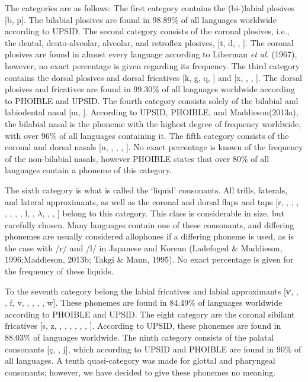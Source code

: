 The categories are as follows: The first category contains the (bi-)labial plosives [b, p]. The bilabial plosives are found in 98.89\% of all languages worldwide according to UPSID. The second category consists of the coronal plosives, i.e., the dental, dento-alveolar, alveolar, and retroflex plosives, [t, d, \textrtailt, \textrtaild]. The coronal plosives are found in almost every language according to Liberman \textit{et al.} (1967), however, no exact percentage is given regarding its frequency. The third category contains the dorsal plosives and dorsal fricatives [k, g, q, \textscg] and [x, \textgamma, \textchi, \textinvscr]. The dorsal plosives and fricatives are found in 99.30\% of all languages worldwide according to PHOIBLE and UPSID. The fourth category consists solely of the bilabial and labiodental nasal [m, \textltailm]. According to UPSID, PHOIBLE, and Maddieson(2013a), the bilabial nasal is the phoneme with the highest degree of frequency worldwide, with over 96\% of all languages containing it. The fifth category consists of the coronal and dorsal nasals [n, \textrtailn ,  \textltailn, \ng, \textscn]. No exact percentage is known of the frequency of the non-bilabial nasals, however PHOIBLE states that over 80\% of all languages contain a phoneme of this category. 

The sixth category is what is called the ‘liquid’ consonants. All trills, laterals, and lateral approximants, as well as the coronal and dorsal flaps and taps [r, \textscr , \textfishhookr, \textrtailr, \textbeltl, \textlyoghlig, \textturnr, \textturnrrtail, l, \textrtaill, $\lambda$, \textscl, \textturnmrleg,  \textturnlonglegr] belong to this category. This class is considerable in size, but carefully chosen. Many languages contain one of these consonants, and differing phonemes are usually considered allophones if a differing phoneme is used, as is the case with /r/ and /l/ in Japanese and Korean (Ladefoged \& Maddieson, 1996;Maddieson, 2013b; Takgi \& Mann, 1995). No exact percentage is given for the frequency of these liquids. 

To the seventh category belong the labial fricatives and labial approximants [ⱱ, \textphi, \textbeta, f, v, \texttheta, \dh, \textscriptv , \textturnw, w]. These phonemes are found in 84.49\% of languages worldwide according to PHOIBLE and UPSID. The eight category are the coronal sibilant fricatives [s, z, \textesh, \textyogh, \textrtails , \textrtailz, \textctc, \textctz,  \texththeng]. According to UPSID, these phonemes are found in 88.03\% of languages worldwide. The ninth category consists of the palatal consonants [\c{c}, \textctj, j], which according to UPSID and PHOIBLE are found in 90\% of all languages. A tenth quasi-category was made for glottal and pharyngeal consonants; however, we have decided to give these phonemes no meaning. 

